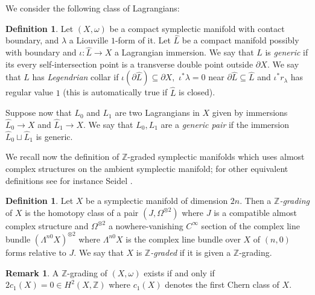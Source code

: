 \documentclass{article}
\theoremstyle{plain}%
\theoremstyle{definition}
\newtheorem{dfn}[thm]{Definition}
\newtheorem{rem}[thm]{Remark}
\numberwithin{equation}{section}
\numberwithin{figure}{section}
\def\l{\label}
\def\Z{{\mathbin{\mathbb Z}}}
\def\io{\iota}
\def\la{\lambda}
\def\om{\omega}
\def\La{\Lambda}
\def\Om{\Omega}
\def\d{{\partial}}
\def\iy{\infty}
\def\sb{\subseteq}
\begin{document}
We consider the following class of Lagrangians:
\begin{dfn}\l{dfn: Lag}
Let $(X,\om)$ be a compact symplectic manifold with contact boundary, and $\la$ a Liouville $1$-form of it. Let $\hat L$ be a compact manifold possibly with boundary and $\io:\hat{L}\to X$ a Lagrangian immersion. We say that $L$ is {\it generic} if its every self-intersection point is a transverse double point outside $\d X.$ We say that $L$ has {\it Legendrian} collar if $\io(\d \hat{L})\sb \d X,$ $\io^*\la=0$ near $\d \hat{L}\sb \hat{L}$ and $\io^*r_\la$ has regular value $1$ (this is automatically true if $\hat{L}$ is closed).

Suppose now that $L_0$  and $L_1$ are two Lagrangians in $X$ given by immersions $\hat L_0\to X$ and $\hat L_1\to X.$
We say that $L_0,L_1$ are a {\it generic pair} if the immersion $\hat L_0\sqcup \hat L_1$ is generic. 
\end{dfn}

We recall now the definition of $\Z$-graded symplectic manifolds which uses almost complex structures on the ambient symplectic manifold; for other equivalent definitions see for instance Seidel \cite{Seid1}.
\begin{dfn}\l{dfn: Z-grading}
Let $X$ be a symplectic manifold of dimension $2n.$ Then a {\it $\Z$-grading} of $X$ is the homotopy class of a pair $(J,\Om^{\otimes2})$ where $J$ is a compatible almost complex structure and $\Om^{\otimes2}$ a nowhere-vanishing $C^\iy$ section of the complex line bundle $(\La^{n0}X)^{\otimes 2}$ where $\La^{n0}X$ is the complex line bundle over $X$ of $(n,0)$ forms relative to $J.$ We say that $X$ is {\it $\Z$-graded} if it is given a $\Z$-grading. 
\end{dfn}
\begin{rem}
A $\Z$-grading of $(X,\om)$ exists if and only if $2c_1(X)=0\in H^2(X,\Z)$ 
where $c_1(X)$ denotes the first Chern class of $X.$
\end{rem}
\end{document}
